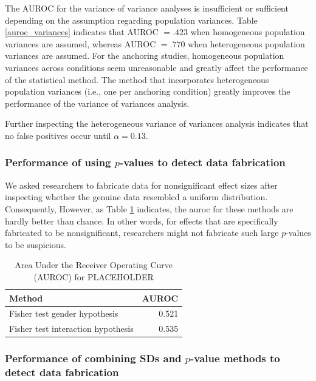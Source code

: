 \documentclass{article}
\begin{document}
The AUROC for the variance of variance analyses is insufficient or sufficient depending on the assumption regarding population variances. Table \ref{auroc_variances} indicates that AUROC $=.423$ when homogeneous population variances are assumed, whereas AUROC $=.770$ when heterogeneous population variances are assumed. For the anchoring studies, homogeneous population variances across conditions seem unreasonable and greatly affect the performance of the statistical method. The method that incorporates heterogeneous population variances (i.e., one per anchoring condition) greatly improves the performance of the variance of variances analysis.

Further inspecting the heterogeneous variance of variances analysis indicates that no false positives occur until $\alpha=0.13$. 

\subsubsection*{Performance of using $p$-values to detect data fabrication}

We asked researchers to fabricate data for nonsignificant effect sizes after inspecting whether the genuine data resembled a uniform distribution. Consequently,  However, as Table \ref{auroc_fisher} indicates, the auroc for these methods are hardly better than chance. In other words, for effects that are specifically fabricated to be nonsignificant, researchers might not fabricate such large $p$-values to be suspicious.

\begin{table}[ht]
\centering
\begin{tabular}{lr}
  \hline
Method & AUROC \\ 
  \hline
Fisher test gender hypothesis & 0.521 \\ 
  Fisher test interaction hypothesis & 0.535 \\ 
   \hline
\end{tabular}
\caption{Area Under the Receiver Operating Curve (AUROC) for PLACEHOLDER} 
\label{auroc_fisher}
\end{table}
\subsubsection*{Performance of combining SDs and $p$-value methods to detect data fabrication}
\end{document}
